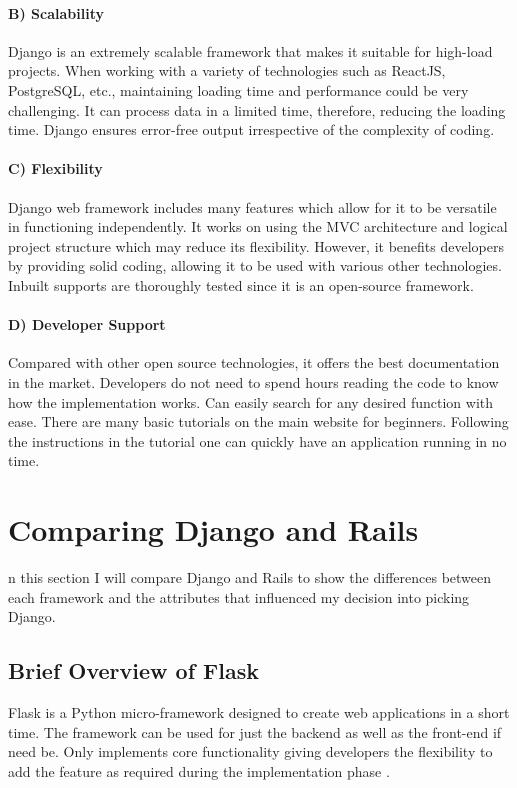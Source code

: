 \paragraph{B) Scalability}
Django is an extremely scalable framework that makes it suitable for high-load projects. When working with a variety of technologies such as ReactJS, PostgreSQL, etc., maintaining loading time and performance could be very challenging. It can process data in a limited time, therefore, reducing the loading time. Django ensures error-free output irrespective of the complexity of coding. 

\paragraph{C) Flexibility}

Django web framework includes many features which allow for it to be versatile in functioning independently. It works on using the MVC architecture and logical project structure which may reduce its flexibility. However, it benefits developers by providing solid coding, allowing it to be used with various other technologies. Inbuilt supports are thoroughly tested since it is an open-source framework.

\paragraph{D) Developer Support}
Compared with other open source technologies, it offers the best documentation in the market. Developers do not need to spend hours reading the code to know how the implementation works. Can easily search for any desired function with ease. There are many basic tutorials on the main website for beginners. Following the instructions in the tutorial one can quickly have an application running in no time. 

\section{Comparing Django and Rails}
n this section I will compare Django and Rails to show the differences between each framework and the attributes that influenced my decision into picking Django. 

\subsection{Brief Overview of Flask}
Flask is a Python micro-framework designed to create web applications in a short time. The framework can be used for just the backend as well as the front-end if need be. Only implements core functionality giving developers the flexibility to add the feature as required during the implementation phase \cite{ghimire2020comparative}.

